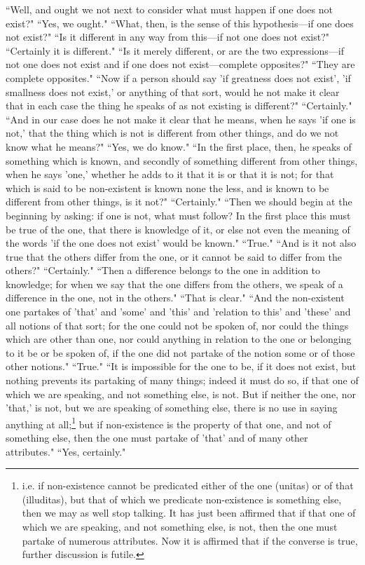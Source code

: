 \documentclass[letterpaper,12pt]{article}
\newcommand{\stephpag}[1]{\marginnote{\small\itshape\fontfamily{ppl}\selectfont #1}}
\begin{document}
``Well, and ought we not next to consider what must happen if one does not exist?" ``Yes, we ought." ``What, then, is the sense of this hypothesis—if one does not exist?" ``Is it different in any way from this—if not one does not exist?" ``Certainly it is different." ``Is it merely different, \stephpag{c} or are the two expressions—if not one does not exist and if one does not exist—complete opposites?" ``They are complete opposites." ``Now if a person should say 'if greatness does not exist', 'if smallness does not exist,' or anything of that sort, would he not make it clear that in each case the thing he speaks of as not existing is different?" ``Certainly." ``And in our case does he not make it clear that he means, when he says 'if one is not,' that the thing which is not is different from other things, and do we not know what he means?" ``Yes, we do know." ``In the first place, then, he speaks of something which is known, and secondly of something different from other things, when he says 'one,' whether he adds to it that it is or that it is not; \stephpag{d} for that which is said to be non-existent is known none the less, and is known to be different from other things, is it not?" ``Certainly." ``Then we should begin at the beginning by asking: if one is not, what must follow? In the first place this must be true of the one, that there is knowledge of it, or else not even the meaning of the words 'if the one does not exist' would be known." ``True." ``And is it not also true that the others differ from the one, or it cannot be said to differ from the others?" ``Certainly." ``Then a difference belongs to the one in addition to knowledge; for when we say that the one differs from the others, \stephpag{e} we speak of a difference in the one, not in the others." ``That is clear." ``And the non-existent one partakes of 'that' and 'some' and 'this' and 'relation to this' and 'these' and all notions of that sort; for the one could not be spoken of, nor could the things which are other than one, nor could anything in relation to the one or belonging to it be or be spoken of, if the one did not partake of the notion some or of those other notions." ``True." ``It is impossible for the one to be, if it does not exist, \stephpag{161 a} but nothing prevents its partaking of many things; indeed it must do so, if that one of which we are speaking, and not something else, is not. But if neither the one, nor 'that,' is not, but we are speaking of something else, there is no use in saying anything at all;\footnote{i.e. if non-existence cannot be predicated either of the one (unitas) or of that (illuditas), but that of which we predicate non-existence is something else, then we may as well stop talking. It has just been affirmed that if that one of which we are speaking, and not something else, is not, then the one must partake of numerous attributes. Now it is affirmed that if the converse is true, further discussion is futile.} but if non-existence is the property of that one, and not of something else, then the one must partake of 'that' and of many other attributes." ``Yes, certainly."
\end{document}
